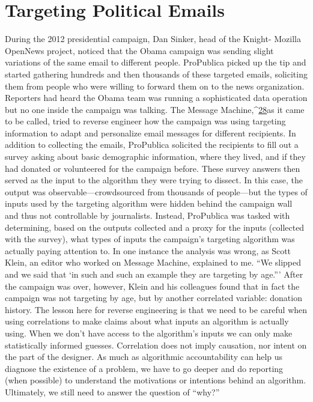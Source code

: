 \section{Targeting Political Emails }
During the 2012 presidential campaign, Dan Sinker, head of the Knight- Mozilla OpenNews project, noticed that the Obama campaign was sending slight variations of the same email to different people. ProPublica picked up the tip and started gathering hundreds and then thousands of these targeted 
emails, soliciting them from people who were willing to forward them on to the news organization. Reporters had heard the Obama team was running a sophisticated data operation but no one inside the campaign was talking. 
The Message Machine,^{\href{#endnotes}{28}}as it came to be called, tried to reverse engineer how the campaign was using targeting information to adapt and personalize email messages for different recipients. In addition to collecting the emails, ProPublica solicited the recipients to fill out a survey asking about basic demographic information, where they lived, and if they had donated or volunteered for the campaign before. These survey answers then served as the input to the algorithm they were trying to dissect. In this case, the output was observable—crowdsourced from thousands of people—but the types of inputs used by the targeting algorithm were hidden behind the campaign wall and thus not controllable by journalists. Instead, ProPublica was tasked with determining, based on the outputs collected and a proxy for the inputs (collected with the survey), what types of inputs the campaign's targeting algorithm was actually paying attention to. 
In one instance the analysis was wrong, as Scott Klein, an editor who worked on Message Machine, explained to me. ``We slipped and we said that ‘in such and such an example they are targeting by age.''' After the campaign was over, however, Klein and his colleagues found that in fact the campaign was not targeting by age, but by another correlated variable: donation history. The lesson here for reverse engineering is that we need to be careful when using correlations to make claims about what inputs an algorithm is actually using. When we don't have access to the algorithm's inputs we can only make statistically informed guesses. Correlation does not imply causation, nor intent on the part of the designer. As much as algorithmic accountability can help us diagnose the existence of a problem, we have to go deeper and do reporting (when possible) to understand the motivations or intentions behind an algorithm. Ultimately, we still need to answer the question of ``why?'' 
